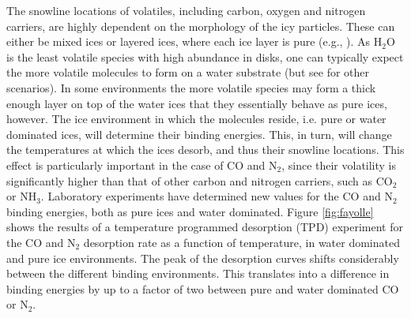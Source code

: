 

The snowline locations of volatiles, including carbon, oxygen and nitrogen carriers, are highly dependent on the morphology of the icy particles. These can either be mixed ices or layered ices, where each ice layer is pure (e.g., \citealt{pontoppidan03}). As H$_2$O is the least volatile species with high abundance in disks, one can typically expect the more volatile molecules to form on a water substrate (but see \citealt{bisschop06} for other scenarios). In some environments the more volatile species may form a thick enough layer on top of the water ices that they essentially behave as pure ices, however. The ice environment in which the molecules reside, i.e. pure or water dominated ices, will determine their binding energies. This, in turn, will change the temperatures at which the ices desorb, and thus their snowline locations. This effect is particularly important in the case of CO and N$_2$, since their volatility is significantly higher than that of other carbon and nitrogen carriers, such as CO$_2$ or NH$_3$. Laboratory experiments \citep{fayolle16} have determined new values for the CO and N$_2$ binding energies, both as pure ices and water dominated. Figure \ref{fig:fayolle} shows the results of a temperature programmed desorption (TPD) experiment for the CO and N$_2$ desorption rate as a function of temperature, in water dominated and pure ice environments. The peak of the desorption curves shifts considerably between the different binding environments. This translates into a difference in binding energies by up to a factor of two between pure and water dominated CO or N$_2$. %

